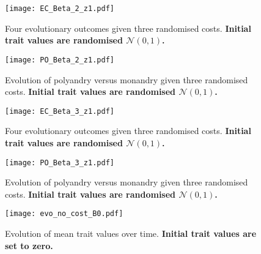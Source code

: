 \documentclass[12pt]{article}
\begin{document}
\clearpage


\begin{figure}
\begin{center}				
\texttt{[image: EC\_Beta\_2\_z1.pdf]}
\end{center}
\caption{Four evolutionary outcomes given three randomised costs. \textbf{Initial trait values are randomised $\mathcal{N}\left(0,1\right)$.}}
\end{figure}

\begin{figure}
\begin{center}				
\texttt{[image: PO\_Beta\_2\_z1.pdf]}
\end{center}
\caption{Evolution of polyandry versus monandry given three randomised costs. \textbf{Initial trait values are randomised $\mathcal{N}\left(0,1\right)$.}}
\end{figure}

\clearpage


\begin{figure}
\begin{center}				
\texttt{[image: EC\_Beta\_3\_z1.pdf]}
\end{center}
\caption{Four evolutionary outcomes given three randomised costs. \textbf{Initial trait values are randomised $\mathcal{N}\left(0,1\right)$.}}
\end{figure}

\begin{figure}
\begin{center}				
\texttt{[image: PO\_Beta\_3\_z1.pdf]}
\end{center}
\caption{Evolution of polyandry versus monandry given three randomised costs. \textbf{Initial trait values are randomised $\mathcal{N}\left(0,1\right)$.}}
\end{figure}

\clearpage


\begin{figure}
\begin{center}				
\texttt{[image: evo\_no\_cost\_B0.pdf]}
\end{center}
\caption{Evolution of mean trait values over time. \textbf{Initial trait values are set to zero.}}
\end{figure}
\end{document}

